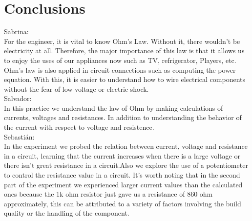 \documentclass[a4paper]{article}
\begin{document}
\section{Conclusions}
{\large Sabrina:}\\
For the engineer, it is vital to know Ohm’s Law. Without it, there wouldn’t be electricity at all. Therefore, the major importance of this law is that it allows us to enjoy the uses of our appliances now such as TV, refrigerator, Players, etc.
Ohm’s law is also applied in circuit connections such as computing the power equation. With this, it
is easier to understand how to wire electrical components without the fear of low voltage or
electric shock.\\[2ex]
{\large Salvador:}\\
In this practice we understand the law of Ohm by making calculations of currents, voltages and resistances. In addition to understanding the behavior of the current with respect to voltage and resistence.\\[2ex]
{\large Sebastián:}\\
In the experiment we probed the relation between current, voltage and resistance in a circuit, learning that the current increases when there is a large voltage or there isn’t great resistance in a circuit.Also we explore the use of a potentiometer to control the resistance value in a circuit. It’s worth noting that in the second part of the experiment we experienced larger current values than the calculated ones because the 1k ohm resistor just gave us a resistance of 860 ohm approximately, this can be attributed to a variety of factors involving the build quality or the handling of the component.
\end{document}
